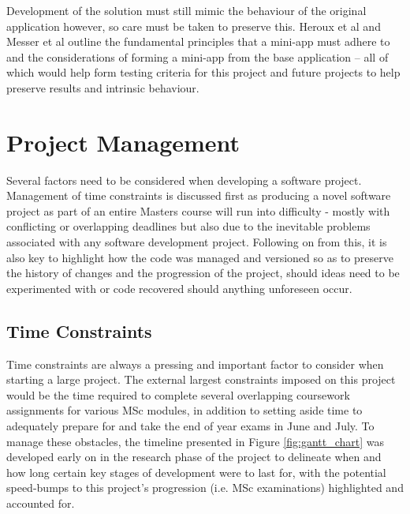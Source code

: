 \documentclass[conference]{IEEEtran}
\begin{document}
Development of the solution must still mimic the behaviour of the original application however, so care must be taken to preserve this. Heroux et al\cite{miniapps} and Messer et al\cite{messer2015developing} outline the fundamental principles that a mini-app must adhere to and the considerations of forming a mini-app from the base application – all of which would help form testing criteria for this project and future projects to help preserve results and intrinsic behaviour.


\section{Project Management}
\label{sec:projectmgmt}

Several factors need to be considered when developing a software project. Management of time constraints is discussed first as producing a novel software project as part of an entire Masters course will run into difficulty - mostly with conflicting or overlapping deadlines but also due to the inevitable problems associated with any software development project. Following on from this, it is also key to highlight how the code was managed and versioned so as to preserve the history of changes and the progression of the project, should ideas need to be experimented with or code recovered should anything unforeseen occur.

\subsection{Time Constraints}

Time constraints are always a pressing and important factor to consider when starting a large project. The external largest constraints imposed on this project would be the time required to complete several overlapping coursework assignments for various MSc modules, in addition to setting aside time to adequately prepare for and take the end of year exams in June and July. To manage these obstacles, the timeline presented in Figure \ref{fig:gantt_chart} was developed early on in the research phase of the project to delineate when and how long certain key stages of development were to last for, with the potential speed-bumps to this project's progression (i.e. MSc examinations) highlighted and accounted for.
\end{document}
